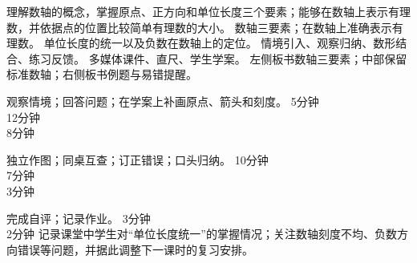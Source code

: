 \documentclass{hepingjie_lessonplan}
\begin{document}
\MakeLessonOverview
  {理解数轴的概念，掌握原点、正方向和单位长度三个要素；能够在数轴上表示有理数，并依据点的位置比较简单有理数的大小。}
  {数轴三要素；在数轴上准确表示有理数。}
  {单位长度的统一以及负数在数轴上的定位。}
  {情境引入、观察归纳、数形结合、练习反馈。}
  {多媒体课件、直尺、学生学案。}
  {左侧板书数轴三要素；中部保留标准数轴；右侧板书例题与易错提醒。}

\MakeTeachingProcessPage
  {
   }
  {观察情境；回答问题；在学案上补画原点、箭头和刻度。}
  {5分钟\\12分钟\\8分钟}

\MakeTeachingProcessPage
  {
   }
  {独立作图；同桌互查；订正错误；口头归纳。}
  {10分钟\\7分钟\\3分钟}

\MakeTeachingProcessReflectionPage
  {
   }
  {完成自评；记录作业。}
  {3分钟\\2分钟}
  {记录课堂中学生对“单位长度统一”的掌握情况；关注数轴刻度不均、负数方向错误等问题，并据此调整下一课时的复习安排。}
\end{document}
